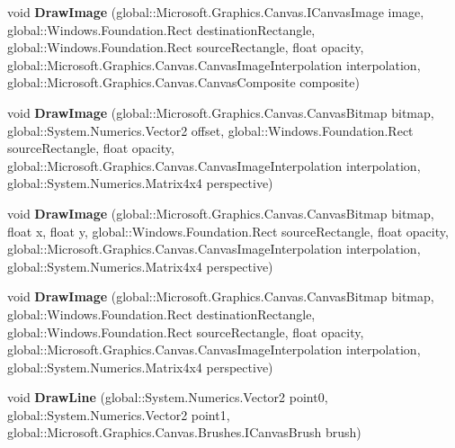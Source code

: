 \begin{DoxyCompactItemize}
void {\bfseries Draw\+Image} (global\+::\+Microsoft.\+Graphics.\+Canvas.\+I\+Canvas\+Image image, global\+::\+Windows.\+Foundation.\+Rect destination\+Rectangle, global\+::\+Windows.\+Foundation.\+Rect source\+Rectangle, float opacity, global\+::\+Microsoft.\+Graphics.\+Canvas.\+Canvas\+Image\+Interpolation interpolation, global\+::\+Microsoft.\+Graphics.\+Canvas.\+Canvas\+Composite composite)
\item 
\mbox{\label{class_microsoft_1_1_graphics_1_1_canvas_1_1_canvas_drawing_session_a32ea31e23a5f575dbea3e701c1110400}} 
void {\bfseries Draw\+Image} (global\+::\+Microsoft.\+Graphics.\+Canvas.\+Canvas\+Bitmap bitmap, global\+::\+System.\+Numerics.\+Vector2 offset, global\+::\+Windows.\+Foundation.\+Rect source\+Rectangle, float opacity, global\+::\+Microsoft.\+Graphics.\+Canvas.\+Canvas\+Image\+Interpolation interpolation, global\+::\+System.\+Numerics.\+Matrix4x4 perspective)
\item 
\mbox{\label{class_microsoft_1_1_graphics_1_1_canvas_1_1_canvas_drawing_session_a2f13c0851b00cd4fdfc70bcb3e91686c}} 
void {\bfseries Draw\+Image} (global\+::\+Microsoft.\+Graphics.\+Canvas.\+Canvas\+Bitmap bitmap, float x, float y, global\+::\+Windows.\+Foundation.\+Rect source\+Rectangle, float opacity, global\+::\+Microsoft.\+Graphics.\+Canvas.\+Canvas\+Image\+Interpolation interpolation, global\+::\+System.\+Numerics.\+Matrix4x4 perspective)
\item 
\mbox{\label{class_microsoft_1_1_graphics_1_1_canvas_1_1_canvas_drawing_session_ab8594b24d98e2dfceb278d1989474281}} 
void {\bfseries Draw\+Image} (global\+::\+Microsoft.\+Graphics.\+Canvas.\+Canvas\+Bitmap bitmap, global\+::\+Windows.\+Foundation.\+Rect destination\+Rectangle, global\+::\+Windows.\+Foundation.\+Rect source\+Rectangle, float opacity, global\+::\+Microsoft.\+Graphics.\+Canvas.\+Canvas\+Image\+Interpolation interpolation, global\+::\+System.\+Numerics.\+Matrix4x4 perspective)
\item 
\mbox{\label{class_microsoft_1_1_graphics_1_1_canvas_1_1_canvas_drawing_session_a2998043fd70a6a9d46333a4729b1f6e3}} 
void {\bfseries Draw\+Line} (global\+::\+System.\+Numerics.\+Vector2 point0, global\+::\+System.\+Numerics.\+Vector2 point1, global\+::\+Microsoft.\+Graphics.\+Canvas.\+Brushes.\+I\+Canvas\+Brush brush)

\end{DoxyCompactItemize}
